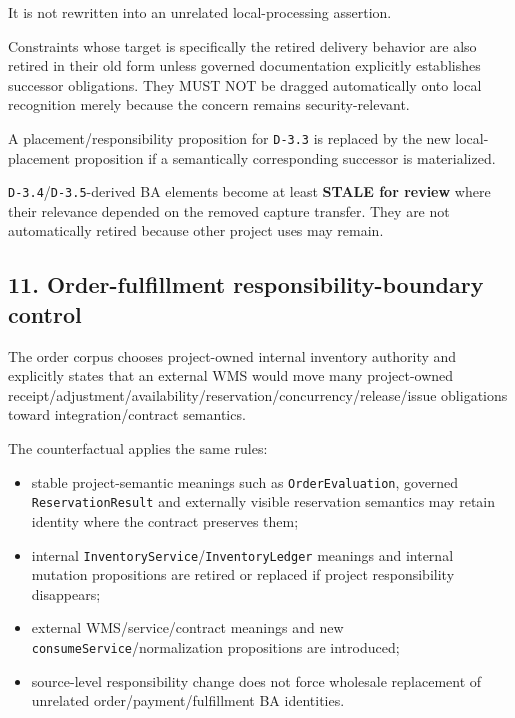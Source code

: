 \documentclass[11pt,a4paper]{article}
\providecommand{\tightlist}{\setlength{\itemsep}{0pt}\setlength{\parskip}{0pt}}\setlength{\emergencystretch}{4em}\hbadness=10000\hfuzz=20pt\sloppy
\begin{document}
It is not rewritten into an unrelated local-processing assertion.

Constraints whose target is specifically the retired delivery behavior
are also retired in their old form unless governed documentation
explicitly establishes successor obligations. They MUST NOT be dragged
automatically onto local recognition merely because the concern remains
security-relevant.

A placement/responsibility proposition for \texttt{D-3.3} is replaced by
the new local-placement proposition if a semantically corresponding
successor is materialized.

\texttt{D-3.4}/\texttt{D-3.5}-derived BA elements become at least
\textbf{STALE for review} where their relevance depended on the removed
capture transfer. They are not automatically retired because other
project uses may remain.

\subsection{11. Order-fulfillment responsibility-boundary
control}\label{order-fulfillment-responsibility-boundary-control}

The order corpus chooses project-owned internal inventory authority and
explicitly states that an external WMS would move many project-owned
receipt/adjustment/availability/reservation/concurrency/release/issue
obligations toward integration/contract semantics.

The counterfactual applies the same rules:

\begin{itemize}
\tightlist
\item
  stable project-semantic meanings such as \texttt{OrderEvaluation},
  governed \texttt{ReservationResult} and externally visible reservation
  semantics may retain identity where the contract preserves them;
\item
  internal \texttt{InventoryService}/\texttt{InventoryLedger} meanings
  and internal mutation propositions are retired or replaced if project
  responsibility disappears;
\item
  external WMS/service/contract meanings and new
  \texttt{consumeService}/normalization propositions are introduced;
\item
  source-level responsibility change does not force wholesale
  replacement of unrelated order/payment/fulfillment BA identities.
\end{itemize}
\end{document}

